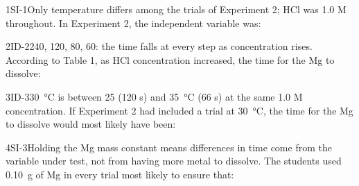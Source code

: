 \documentclass[11pt]{article}
\begin{document}
\begin{minipage}[t]{0.32\linewidth}
\end{minipage}\hfill
\begin{minipage}[t]{0.32\linewidth}
\end{minipage}\hfill
\begin{minipage}[t]{0.32\linewidth}
\end{minipage}
\passageend

\begin{q}{1}{SI-1}{Only temperature differs among the trials of Experiment 2; HCl was 1.0 M throughout.}
In Experiment 2, the independent variable was:
\end{q}

\begin{q}{2}{ID-2}{240, 120, 80, 60: the time falls at every step as concentration rises.}
According to Table 1, as HCl concentration increased, the time for the Mg to dissolve:
\end{q}

\begin{q}{3}{ID-3}{\SI{30}{\celsius} is between 25 (120 s) and \SI{35}{\celsius} (66 s) at the same 1.0 M concentration.}
If Experiment 2 had included a trial at \SI{30}{\celsius}, the time for the Mg to dissolve would most likely have been:
\end{q}

\begin{q}{4}{SI-3}{Holding the Mg mass constant means differences in time come from the variable under test, not from having more metal to dissolve.}
The students used \SI{0.10}{\gram} of Mg in every trial most likely to ensure that:
\end{q}
\end{document}

